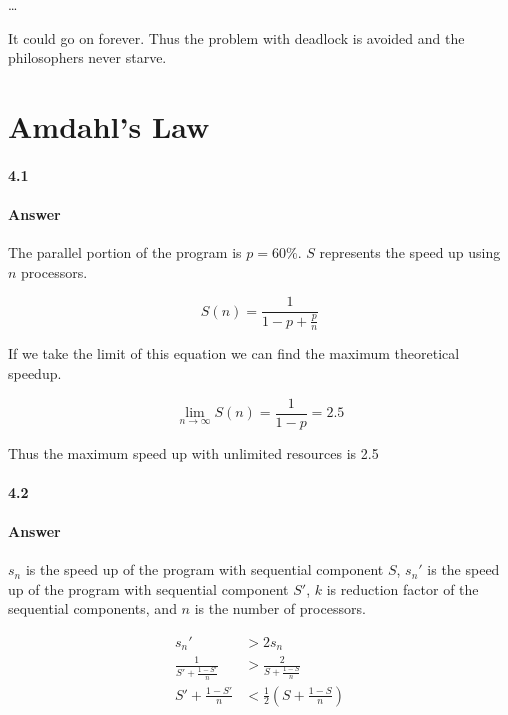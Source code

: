 \documentclass[12pt,letterpaper,titlepage]{article}
\begin{document}
  
  \begin{center}
    \dots
  \end{center}
  
  
  It could go on forever. Thus the problem with deadlock is avoided and the philosophers never starve.
  
  \section{Amdahl's Law}
  \paragraph{4.1}
  
  \paragraph{Answer} The parallel portion of the program is $p = 60\%$. $S$ represents the speed up using $n$ processors.
  
  \begin{equation*}
  S(n) = \frac{1}{1 - p + \frac{p}{n}}
  \end{equation*}
  
  If we take the limit of this equation we can find the maximum theoretical speedup.
  
  \begin{equation*}
  \lim_{n \rightarrow \infty} S(n) = \frac{1}{1 - p} = 2.5
  \end{equation*}
  
  Thus the maximum speed up with unlimited resources is 2.5
  
  \paragraph{4.2}
  
  \paragraph{Answer} $s_n$ is the speed up of the program with sequential component $S$, $s_n'$ is the speed up of the program with sequential component $S'$, $k$ is reduction factor of the sequential components, and $n$ is the number of processors.
  
  \begin{align*}
  s_n' &> 2 s_n \\
  \frac{1}{S' + \frac{1-S'}{n}} &> \frac{2}{S + \frac{1-S}{n}} \\
  S' + \frac{1-S'}{n} &< \frac{1}{2}\left( S + \frac{1-S}{n}\right)
  \end{align*}
  
\end{document}
